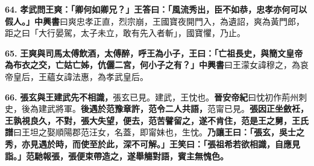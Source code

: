 \textbf{64.} \textbf{孝武問王爽：「卿何如卿兄？」王答曰：「風流秀出，臣不如恭，忠孝亦何可以假人。」}{\footnotesize \textbf{中興書}曰爽忠孝正直，烈宗崩，王國寶夜開門入，為遺詔，爽為黃門郎，距之曰「大行晏駕，太子未立，敢有先入者斬」，國寶懼，乃止。}

\textbf{65.} \textbf{王爽與司馬太傅飲酒，太傅醉，呼王為小子，王曰：「亡祖長史，與簡文皇帝為布衣之交，亡姑亡姊，伉儷二宮，何小子之有？」}{\footnotesize \textbf{中興書}曰王濛女諱穆之，為哀帝皇后，王蘊女諱法惠，為孝武皇后。}

\textbf{66.} \textbf{張玄與王建武先不相識，}{\footnotesize 張玄已見。建武，王忱也。\textbf{晉安帝紀}曰忱初作荊州刺史，後為建武將軍。}\textbf{後遇於范豫章許，范令二人共語，}{\footnotesize 范甯已見。}\textbf{張因正坐斂衽，王孰視良久，不對，張大失望，便去，范苦譬留之，遂不肯住，范是王之舅，}{\footnotesize \textbf{王氏譜}曰王坦之娶順陽郡范汪女，名蓋，即甯妹也，生忱。}\textbf{乃讓王曰：「張玄，吳士之秀，亦見遇於時，而使至於此，深不可解。」王笑曰：「張祖希若欲相識，自應見詣。」范馳報張，張便束帶造之，遂舉觴對語，賓主無愧色。}